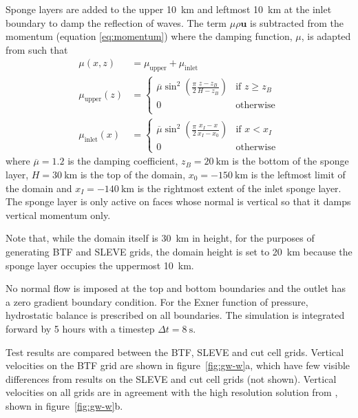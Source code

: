 \documentclass[twocol]{ametsoc}
\begin{document}
Sponge layers are added to the upper \SI{10}{\kilo\meter} and leftmost \SI{10}{\kilo\meter} at the inlet boundary to damp the reflection of waves.
The term $\mu \rho \bm{u}$ is subtracted from the momentum (equation \ref{eq:momentum}) where the damping function, \(\mu\), is adapted from \citet{melvin2010} such that
\begin{align}
	\mu(x, z) &= \mu_\mathrm{upper} + \mu_\mathrm{inlet} \\
	\mu_\mathrm{upper}(z) &= \begin{cases}
		\overline{\mu} \sin^2 \left( \frac{\pi}{2} \frac{z - z_B}{H - z_B} \right) & \text{if } z \geq z_B \\
		0 & \text{otherwise} \\
	\end{cases} \\
	\mu_\mathrm{inlet}(x) &= \begin{cases}
		\overline{\mu} \sin^2 \left( \frac{\pi}{2} \frac{x_I - x}{x_I - x_0} \right) & \text{if } x < x_I \\
		0 & \text{otherwise}
	\end{cases}
\end{align}
where $\overline{\mu} = 1.2$ is the damping coefficient, $z_B = \SI{20}{\kilo\meter}$ is the bottom of the sponge layer, $H = \SI{30}{\kilo\meter}$ is the top of the domain, $x_0 = \SI{-150}{\kilo\meter}$ is the leftmost limit of the domain and $x_I = \SI{-140}{\kilo\meter}$ is the rightmost extent of the inlet sponge layer.  The sponge layer is only active on faces whose normal is vertical so that it damps vertical momentum only.

Note that, while the domain itself is \SI{30}{\kilo\meter} in height, for the purposes of generating BTF and SLEVE grids, the domain height is set to \SI{20}{\kilo\meter} because the sponge layer occupies the uppermost \SI{10}{\kilo\meter}.

No normal flow is imposed at the top and bottom boundaries and the outlet has a zero gradient boundary condition.  For the Exner function of pressure, hydrostatic balance is prescribed on all boundaries.  The simulation is integrated forward by 5 hours with a timestep $\Delta t = \SI{8}{\second}$.

Test results are compared between the BTF, SLEVE and cut cell grids.  Vertical velocities on the BTF grid are shown in figure~\ref{fig:gw-w}a, which have few visible differences from results on the SLEVE and cut cell grids (not shown).  Vertical velocities on all grids are in agreement with the high resolution solution from \citet{melvin2010}, shown in figure~\ref{fig:gw-w}b.
\end{document}
